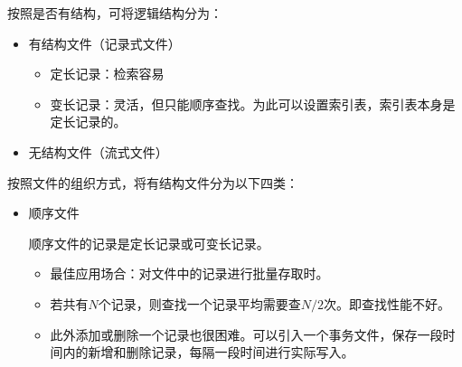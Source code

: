 \documentclass[12pt, a4paper, oneside]{ctexart}
\begin{document}
按照是否有结构，可将逻辑结构分为：
\begin{itemize}
  \item 有结构文件（记录式文件）
  \begin{itemize}
    \item 定长记录：检索容易
    \item 变长记录：灵活，但只能顺序查找。为此可以设置索引表，索引表本身是定长记录的。
  \end{itemize}
  \item 无结构文件（流式文件）
\end{itemize}

按照文件的组织方式，将有结构文件分为以下四类：
\begin{itemize}
  \item 顺序文件
  
  顺序文件的记录是定长记录或可变长记录。
  \begin{itemize}
    \item 最佳应用场合：对文件中的记录进行批量存取时。
    \item 若共有$N$个记录，则查找一个记录平均需要查$N/2$次。即查找性能不好。
    \item 此外添加或删除一个记录也很困难。可以引入一个事务文件，保存一段时间内的新增和删除记录，每隔一段时间进行实际写入。
  \end{itemize}


\end{itemize}
\end{document}
